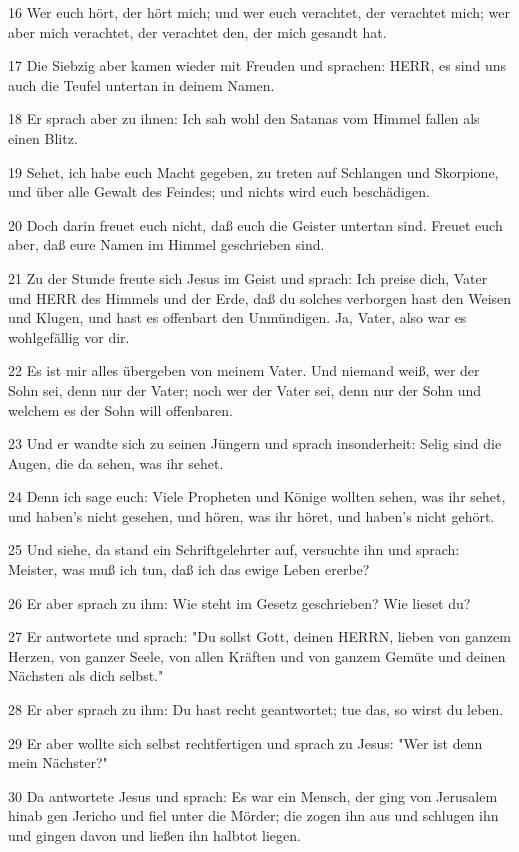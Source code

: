 \par 16 Wer euch hört, der hört mich; und wer euch verachtet, der verachtet mich; wer aber mich verachtet, der verachtet den, der mich gesandt hat.
\par 17 Die Siebzig aber kamen wieder mit Freuden und sprachen: HERR, es sind uns auch die Teufel untertan in deinem Namen.
\par 18 Er sprach aber zu ihnen: Ich sah wohl den Satanas vom Himmel fallen als einen Blitz.
\par 19 Sehet, ich habe euch Macht gegeben, zu treten auf Schlangen und Skorpione, und über alle Gewalt des Feindes; und nichts wird euch beschädigen.
\par 20 Doch darin freuet euch nicht, daß euch die Geister untertan sind. Freuet euch aber, daß eure Namen im Himmel geschrieben sind.
\par 21 Zu der Stunde freute sich Jesus im Geist und sprach: Ich preise dich, Vater und HERR des Himmels und der Erde, daß du solches verborgen hast den Weisen und Klugen, und hast es offenbart den Unmündigen. Ja, Vater, also war es wohlgefällig vor dir.
\par 22 Es ist mir alles übergeben von meinem Vater. Und niemand weiß, wer der Sohn sei, denn nur der Vater; noch wer der Vater sei, denn nur der Sohn und welchem es der Sohn will offenbaren.
\par 23 Und er wandte sich zu seinen Jüngern und sprach insonderheit: Selig sind die Augen, die da sehen, was ihr sehet.
\par 24 Denn ich sage euch: Viele Propheten und Könige wollten sehen, was ihr sehet, und haben's nicht gesehen, und hören, was ihr höret, und haben's nicht gehört.
\par 25 Und siehe, da stand ein Schriftgelehrter auf, versuchte ihn und sprach: Meister, was muß ich tun, daß ich das ewige Leben ererbe?
\par 26 Er aber sprach zu ihm: Wie steht im Gesetz geschrieben? Wie lieset du?
\par 27 Er antwortete und sprach: "Du sollst Gott, deinen HERRN, lieben von ganzem Herzen, von ganzer Seele, von allen Kräften und von ganzem Gemüte und deinen Nächsten als dich selbst."
\par 28 Er aber sprach zu ihm: Du hast recht geantwortet; tue das, so wirst du leben.
\par 29 Er aber wollte sich selbst rechtfertigen und sprach zu Jesus: "Wer ist denn mein Nächster?"
\par 30 Da antwortete Jesus und sprach: Es war ein Mensch, der ging von Jerusalem hinab gen Jericho und fiel unter die Mörder; die zogen ihn aus und schlugen ihn und gingen davon und ließen ihn halbtot liegen.
